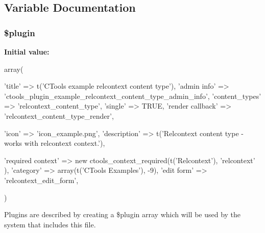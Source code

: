 \subsection{Variable Documentation}
\hypertarget{relcontext__content__type_8inc_ada8a7130088351710bb02ed622d6bf65}{
\subsubsection[{\$plugin}]{\setlength{\rightskip}{0pt plus 5cm}\$plugin}}
\label{relcontext__content__type_8inc_ada8a7130088351710bb02ed622d6bf65}
{\bfseries Initial value:}
\begin{DoxyCode}
 array(
  
  'title' => t('CTools example relcontext content type'),
  'admin info' => 'ctools_plugin_example_relcontext_content_type_admin_info',
  'content_types' => 'relcontext_content_type',
  'single' => TRUE,
  'render callback' => 'relcontext_content_type_render',
  
  'icon' => 'icon_example.png',
  'description' => t('Relcontext content type - works with relcontext context.'),
      
  'required context' => new ctools_context_required(t('Relcontext'), 'relcontext'
      ),
  'category' => array(t('CTools Examples'), -9),
  'edit form' => 'relcontext_edit_form',

  
  

)
\end{DoxyCode}
Plugins are described by creating a \$plugin array which will be used by the system that includes this file. 